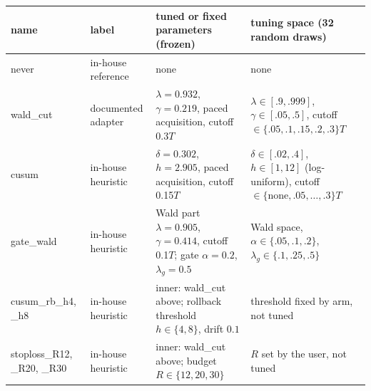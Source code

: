 \begin{tabular}{@{}p{2.3cm}p{3.2cm}p{5.6cm}p{4.0cm}@{}}
\toprule
name & label & tuned or fixed parameters (frozen) & tuning space (32 random draws)\\
\midrule
never & in-house reference & none & none \\
wald\_cut & documented adapter & $\lambda=0.932$, $\gamma=0.219$, paced acquisition, cutoff 0.3$T$ & $\lambda\in[.9,.999]$, $\gamma\in[.05,.5]$, cutoff $\in\{.05,.1,.15,.2,.3\}T$ \\
cusum & in-house heuristic & $\delta=0.302$, $h=2.905$, paced acquisition, cutoff 0.15$T$ & $\delta\in[.02,.4]$, $h\in[1,12]$ (log-uniform), cutoff $\in\{\text{none},.05,\dots,.3\}T$ \\
gate\_wald & in-house heuristic & Wald part $\lambda=0.905$, $\gamma=0.414$, cutoff 0.1$T$; gate $\alpha=0.2$, $\lambda_g=0.5$ & Wald space, $\alpha\in\{.05,.1,.2\}$, $\lambda_g\in\{.1,.25,.5\}$ \\
cusum\_rb\_h4, \_h8 & in-house heuristic & inner: wald\_cut above; rollback threshold $h\in\{4,8\}$, drift $0.1$ & threshold fixed by arm, not tuned \\
stoploss\_R12, \_R20, \_R30 & in-house heuristic & inner: wald\_cut above; budget $R\in\{12,20,30\}$ & $R$ set by the user, not tuned \\
\bottomrule
\end{tabular}
